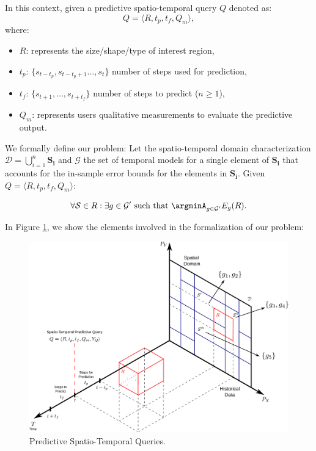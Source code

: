 In this context, given a predictive spatio-temporal query $Q$ denoted as:
\begin{equation} \label{eq:predictivequery}
Q = \langle R, t_{p}, t_{f}, Q_{m} \rangle,
\end{equation}
where:
\begin{itemize}[noitemsep,nolistsep]	
	\item $R$: represents the size/shape/type of interest region,
	\item $t_{p}$: $\{s_{t-t_p}, s_{t-t_{p}+1}\ldots, s_{t}\}$ number of steps used for  prediction,
	\item $t_{f}$: $\{s_{t+1}, \ldots, s_{t+t_f}\}$ number of steps to predict ($n\geq 1$),
	\item $Q_{m}$: represents users qualitative measurements to evaluate the predictive output.
\end{itemize}


We formally define our problem: Let the spatio-temporal domain characterization $\mathcal{D} = \bigcup_{i=1}^{n} \mathbf{S_i}$ and $\mathcal{G}$ the set of temporal models for a single element of $\mathbf{S_i}$ that accounts for the in-sample error bounds for the elements in $\mathbf{S_i}$. Given $Q = \langle R, t_{p}, t_{f}, Q_{m} \rangle$:

\begin{equation}
\forall \mathcal{S} \in R: \exists g \in \mathcal{G'} \,\,\textrm{such that} \,\, \argminA_{g\in\mathcal{G'}} E_{g}(R).
\end{equation}

\noindent In Figure \ref{fig:time-series}, we show the elements involved in the formalization of our problem:
\begin{figure}[htb]
	\centering
	\includegraphics[scale=0.25]{../Figures/RepresentationTimeSeries}
	\caption{Predictive Spatio-Temporal Queries.}
	\label{fig:time-series}
\end{figure}


